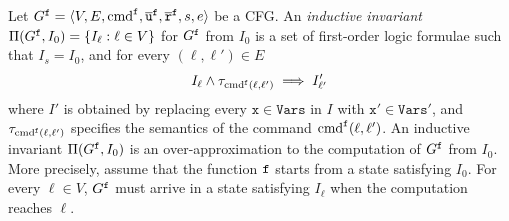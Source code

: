 Let $G^{\mathtt{{f}}} = \langle V, E ,\textmd{cmd}^{\mathtt{{f}}},
\overline{\mathtt{u}}^{\mathtt{{f}}}, \overline{\mathtt{r}}^{\mathtt{{f}}},  s,
e \rangle$ be a CFG. An \emph{inductive invariant} $\Pi (G^{\mathtt{{f}}},
I_0) = \{ I_\ell : \ell \in V \}$ for $G^{\mathtt{{f}}}$ from $I_0$ is a
set of first-order logic formulae such that $I_s = I_0$, and
for every $(\ell, \ell') \in E$ 
\begin{equation*}
I_{\ell} \wedge \tau_{\textmd{cmd}^{\mathtt{{f}}}(\ell, \ell')} \implies I'_{\ell'}
\end{equation*}
where $I'$ is obtained by replacing every $\mathtt{x} \in
\mathtt{Vars}$ in $I$ with $\mathtt{x}' \in \mathtt{Vars}'$, and
$\tau_{\textmd{cmd}^{\mathtt{{f}}} (\ell, \ell')}$ specifies the semantics of the command
$\textmd{cmd}^{\mathtt{{f}}} (\ell, \ell')$. An inductive invariant $\Pi
(G^{\mathtt{{f}}}, I_0)$ is an 
over-approximation to the computation of $G^{\mathtt{{f}}}$ from $I_0$. More
precisely, assume that the function ${\mathtt{{f}}}$ starts from a state satisfying
$I_0$. For every $\ell\in V$, $G^{\mathtt{{f}}}$ must arrive in a state
satisfying $I_{\ell}$ when the computation reaches $\ell$. 

